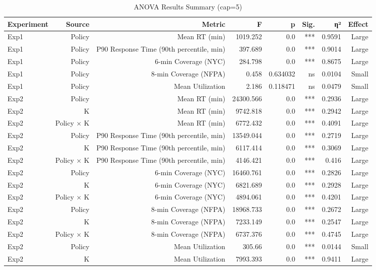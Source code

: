 \begin{table}[htbp]
\centering
\caption{ANOVA Results Summary (cap=5)}
\label{tab:anova}
\begin{tabular}{lrrrrrrr}
\toprule
Experiment & Source & Metric & F & p & Sig. & η² & Effect \\
\midrule
Exp1 & Policy & Mean RT (min) & 1019.252 & 0.0 & *** & 0.9591 & Large \\
Exp1 & Policy & P90 Response Time (90th percentile, min) & 397.689 & 0.0 & *** & 0.9014 & Large \\
Exp1 & Policy & 6-min Coverage (NYC) & 284.798 & 0.0 & *** & 0.8675 & Large \\
Exp1 & Policy & 8-min Coverage (NFPA) & 0.458 & 0.634032 & ns & 0.0104 & Small \\
Exp1 & Policy & Mean Utilization & 2.186 & 0.118471 & ns & 0.0479 & Small \\
Exp2 & Policy & Mean RT (min) & 24300.566 & 0.0 & *** & 0.2936 & Large \\
Exp2 & K & Mean RT (min) & 9742.818 & 0.0 & *** & 0.2942 & Large \\
Exp2 & Policy × K & Mean RT (min) & 6772.432 & 0.0 & *** & 0.4091 & Large \\
Exp2 & Policy & P90 Response Time (90th percentile, min) & 13549.044 & 0.0 & *** & 0.2719 & Large \\
Exp2 & K & P90 Response Time (90th percentile, min) & 6117.414 & 0.0 & *** & 0.3069 & Large \\
Exp2 & Policy × K & P90 Response Time (90th percentile, min) & 4146.421 & 0.0 & *** & 0.416 & Large \\
Exp2 & Policy & 6-min Coverage (NYC) & 16460.761 & 0.0 & *** & 0.2826 & Large \\
Exp2 & K & 6-min Coverage (NYC) & 6821.689 & 0.0 & *** & 0.2928 & Large \\
Exp2 & Policy × K & 6-min Coverage (NYC) & 4894.061 & 0.0 & *** & 0.4201 & Large \\
Exp2 & Policy & 8-min Coverage (NFPA) & 18968.733 & 0.0 & *** & 0.2672 & Large \\
Exp2 & K & 8-min Coverage (NFPA) & 7233.149 & 0.0 & *** & 0.2547 & Large \\
Exp2 & Policy × K & 8-min Coverage (NFPA) & 6737.376 & 0.0 & *** & 0.4745 & Large \\
Exp2 & Policy & Mean Utilization & 305.66 & 0.0 & *** & 0.0144 & Small \\
Exp2 & K & Mean Utilization & 7993.393 & 0.0 & *** & 0.9411 & Large \\

\end{tabular}
\end{table}
